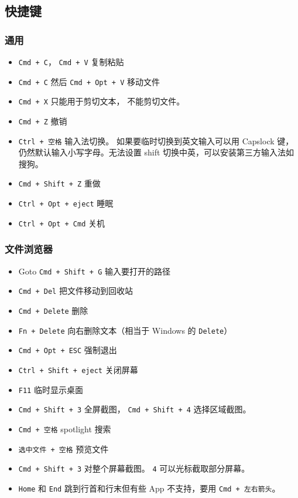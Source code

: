 \subsection{快捷键}

\subsubsection{通用}
\begin{itemize}
\item \verb|Cmd + C|， \verb|Cmd + V| 复制粘贴
\item \verb|Cmd + C| 然后 \verb|Cmd + Opt + V| 移动文件
\item \verb|Cmd + X| 只能用于剪切文本， 不能剪切文件。
\item \verb|Cmd + Z| 撤销
\item \verb|Ctrl + 空格| 输入法切换。 如果要临时切换到英文输入可以用 Capslock 键，仍然默认输入小写字母。无法设置 shift 切换中英，可以安装第三方输入法如搜狗。
\item \verb|Cmd + Shift + Z| 重做
\item \verb|Ctrl + Opt + eject| 睡眠
\item \verb|Ctrl + Opt + Cmd| 关机
\end{itemize}

\subsubsection{文件浏览器}
\begin{itemize}
\item Goto \verb`Cmd + Shift + G` 输入要打开的路径
\item \verb|Cmd + Del| 把文件移动到回收站
\item \verb|Cmd + Delete| 删除
\item \verb|Fn + Delete| 向右删除文本（相当于 Windows 的 \verb|Delete|）
\item \verb|Cmd + Opt + ESC| 强制退出
\item \verb|Ctrl + Shift + eject| 关闭屏幕
\item \verb|F11| 临时显示桌面
\item \verb|Cmd + Shift + 3| 全屏截图， \verb|Cmd + Shift + 4| 选择区域截图。
\item \verb|Cmd + 空格| spotlight 搜索
\item \verb|选中文件 + 空格| 预览文件
\item \verb|Cmd + Shift + 3| 对整个屏幕截图。 \verb|4| 可以光标截取部分屏幕。
\item \verb|Home| 和 \verb|End| 跳到行首和行末但有些 App 不支持，要用 \verb|Cmd + 左右箭头|。
\end{itemize}

